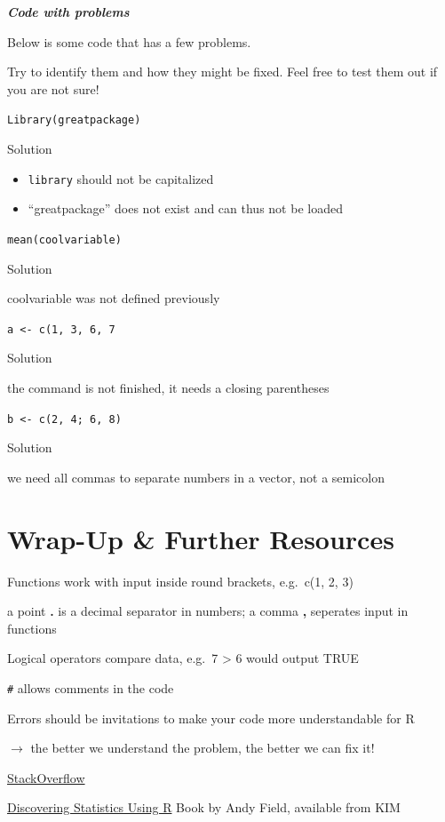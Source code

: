 \documentclass[
]{book}
\providecommand{\tightlist}{%
  \setlength{\itemsep}{0pt}\setlength{\parskip}{0pt}}
\begin{document}
\textbf{\emph{Code with problems}}

Below is some code that has a few problems.

Try to identify them and how they might be fixed. Feel free to test them out if you are not sure!

\texttt{Library(greatpackage)}

Solution

\begin{itemize}
\tightlist
\item
  \texttt{library} should not be capitalized
\item
  ``greatpackage'' does not exist and can thus not be loaded
\end{itemize}

\texttt{mean(coolvariable)}

Solution

coolvariable was not defined previously

\texttt{a\ \textless{}-\ c(1,\ 3,\ 6,\ 7}

Solution

the command is not finished, it needs a closing parentheses

\texttt{b\ \textless{}-\ c(2,\ 4;\ 6,\ 8)}

Solution

we need all commas to separate numbers in a vector, not a semicolon

\section*{Wrap-Up \& Further Resources}\label{wrap-up-further-resources-1}

Functions work with input inside round brackets, e.g.~c(1, 2, 3)

a point \textbf{.} is a decimal separator in numbers; a comma \textbf{,} seperates input in functions

Logical operators compare data, e.g.~7 \textgreater{} 6 would output TRUE

\texttt{\#} allows comments in the code

Errors should be invitations to make your code more understandable for R

\(\rightarrow\) the better we understand the problem, the better we can fix it!

\href{https://stackoverflow.com/}{StackOverflow}

\href{https://katalog.uni-konstanz.de/libero/WebOpac.cls?VERSION=2&ACTION=DISPLAY&RSN=2222774&DATA=KON&TOKEN=nGIfSiZsIA5826&Z=1&SET=1}{Discovering Statistics Using R} Book by Andy Field, available from KIM
\end{document}
